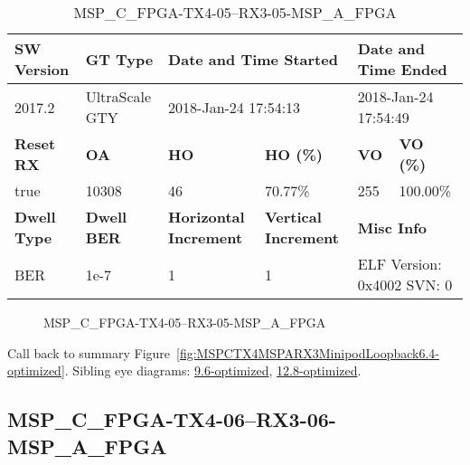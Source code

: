 \begin{table}[h]
\centering
\caption{MSP\_C\_FPGA-TX4-05--RX3-05-MSP\_A\_FPGA}
\label{tab:MSPCFPGATX405RX305MSPAFPGA6.4-optimized}
\begin{tabular}{@{}|l|l|l|l|l|l|@{}}
\toprule
\textbf{SW Version}                & \textbf{GT Type}   & \multicolumn{2}{l|}{\textbf{Date and Time Started}}            & \multicolumn{2}{l|}{\textbf{Date and Time Ended}}        \\ \midrule
2017.2                       & UltraScale GTY          & \multicolumn{2}{l|}{2018-Jan-24 17:54:13}                   & \multicolumn{2}{l|}{2018-Jan-24 17:54:49}               \\ \midrule
\textbf{Reset RX}                  & \textbf{OA} & \textbf{HO}   & \textbf{HO (\%)} & \textbf{VO} & \textbf{VO (\%)} \\ \midrule
true & 10308        & 46          & 70.77\%        & 255        & 100.00\%       \\ \midrule
\textbf{Dwell Type}                & \textbf{Dwell BER} & \textbf{Horizontal Increment} & \textbf{Vertical Increment}    & \multicolumn{2}{l|}{\textbf{Misc Info}}                  \\ \midrule
BER                            & 1e-7        & 1        & 1           & \multicolumn{2}{l|}{ELF Version: 0x4002 SVN: 0}                         \\ \bottomrule
\end{tabular}
\end{table}

\begin{figure}[h]
\caption{MSP\_C\_FPGA-TX4-05--RX3-05-MSP\_A\_FPGA} \label{fig:MSPCFPGATX405RX305MSPAFPGA6.4-optimized}
\end{figure}

Call back to summary Figure~\ref{fig:MSPCTX4MSPARX3MinipodLoopback6.4-optimized}.
Sibling eye diagrams: \hyperref[sec:MSPCFPGATX405RX305MSPAFPGA9.6-optimized]{9.6-optimized}, \hyperref[sec:MSPCFPGATX405RX305MSPAFPGA12.8-optimized]{12.8-optimized}.

\clearpage
\newpage


\subsection{MSP\_C\_FPGA-TX4-06--RX3-06-MSP\_A\_FPGA}\label{sec:MSPCFPGATX406RX306MSPAFPGA6.4-optimized}


